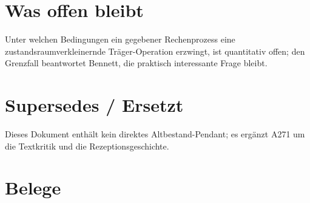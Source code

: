 \section{Was offen bleibt}

Unter welchen Bedingungen ein gegebener Rechenprozess eine
zustandsraumverkleinernde Träger-Operation erzwingt, ist quantitativ offen; den
Grenzfall beantwortet Bennett, die praktisch interessante Frage bleibt.

\section{Supersedes / Ersetzt}

Dieses Dokument enthält kein direktes Altbestand-Pendant; es ergänzt A271 um die
Textkritik und die Rezeptionsgeschichte.

\clearpage
{}
{}
\section*{Belege}

